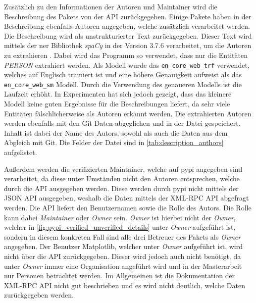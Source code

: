 Zusätzlich zu den Informationen der Autoren und Maintainer wird die Beschreibung des Pakets von der API zurückgegeben.
Einige Pakete haben in der Beschreibung ebenfalls Autoren angegeben, welche zusätzlich verarbeitet werden.
Die Beschreibung wird als unstrukturierter Text zurückgegeben.
Dieser Text wird mittels der \gls{ner} Bibliothek \emph{spaCy} in der Version 3.7.6 verarbeitet, um die Autoren zu extrahieren \autocite{honnibal_spacy_2020}.
Dabei wird das Programm so verwendet, dass nur die Entitäten \emph{PERSON} extrahiert werden.
Als Modell wurde das \texttt{en\_core\_web\_trf} verwendet, welches auf Englisch trainiert ist und eine höhere Genauigkeit aufweist als das \texttt{en\_core\_web\_sm} Modell.
Durch die Verwendung des genaueren Modells ist die Laufzeit erhöht. 
In Experimenten hat sich jedoch gezeigt, dass das kleinere Modell keine guten Ergebnisse für die Beschreibungen liefert, da sehr viele Entitäten fälschlicherweise als Autoren erkannt werden.
Die extrahierten Autoren werden ebenfalls mit den Git Daten abgeglichen und in der Datei  gespeichert.
Inhalt ist dabei der Name des Autors, sowohl als auch die Daten aus dem Abgleich mit Git.
Die Felder der Datei sind in \autoref{tab:description_authors} aufgelistet.

Außerdem werden die verifizierten Maintainer, welche auf \gls{pypi} angegeben sind verarbeitet, da diese unter Umständen nicht den Autoren entsprechen, welche durch die API ausgegeben werden.
Diese werden durch \gls{pypi} nicht mittels der JSON API ausgegeben, weshalb die Daten mittels der XML-RPC API abgefragt werden.
Die API liefert den Benutzernamen sowie die Rolle des Autors.
Die Rolle kann dabei \emph{Maintainer} oder \emph{Owner} sein.
\emph{Owner} ist hierbei nicht der \emph{Owner}, welcher in \autoref{fig:pypi_verified_unverified_details} unter \emph{Owner} aufgeführt ist, sondern in diesem konkreten Fall sind alle drei Betreuer des Pakets als \emph{Owner} angegeben.
Der Benutzer \grqq Matplotlib\glqq{}, welcher unter \emph{Owner} aufgeführt ist, wird nicht über die API zurückgegeben.
Dieser wird jedoch auch nicht benötigt, da unter \emph{Owner} immer eine Organisation angeführt wird und in der Masterarbeit nur Personen betrachtet werden.
Im Allgemeinen ist die Dokumentation der XML-RPC API nicht gut beschrieben und es wird nicht deutlich, welche Daten zurückgegeben werden.


